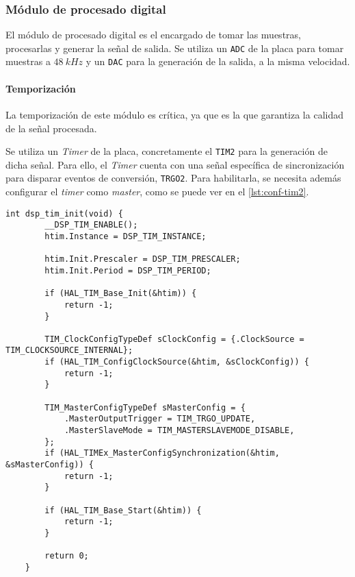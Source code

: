 \subsubsection{Módulo de procesado digital}

El módulo de procesado digital es el encargado de tomar las muestras, procesarlas y generar la señal de salida. Se utiliza un \texttt{ADC} de la placa para tomar muestras a $48\ kHz$ y un \texttt{DAC} para la generación de la salida, a la misma velocidad.

\paragraph{Temporización}

La temporización de este módulo es crítica, ya que es la que garantiza la calidad de la señal procesada. 

Se utiliza un \textit{Timer} de la placa, concretamente el \texttt{TIM2} para la generación de dicha señal. Para ello, el \textit{Timer} cuenta con una señal específica de sincronización para disparar eventos de conversión, \texttt{TRGO2}. Para habilitarla, se necesita además configurar el \textit{timer} como \textit{master}, como se puede ver en el \autoref{lst:conf-tim2}.

\begin{lstlisting}[captionpos=t, caption={Configuración del \textit{timer} de sincronización}]
    int dsp_tim_init(void) {
        __DSP_TIM_ENABLE();
        htim.Instance = DSP_TIM_INSTANCE;

        htim.Init.Prescaler = DSP_TIM_PRESCALER;
        htim.Init.Period = DSP_TIM_PERIOD;

        if (HAL_TIM_Base_Init(&htim)) {
            return -1;
        }

        TIM_ClockConfigTypeDef sClockConfig = {.ClockSource = TIM_CLOCKSOURCE_INTERNAL};
        if (HAL_TIM_ConfigClockSource(&htim, &sClockConfig)) {
            return -1;
        }

        TIM_MasterConfigTypeDef sMasterConfig = {
            .MasterOutputTrigger = TIM_TRGO_UPDATE,
            .MasterSlaveMode = TIM_MASTERSLAVEMODE_DISABLE,
        };
        if (HAL_TIMEx_MasterConfigSynchronization(&htim, &sMasterConfig)) {
            return -1;
        }

        if (HAL_TIM_Base_Start(&htim)) {
            return -1;
        }

        return 0;
    }
\end{lstlisting}

